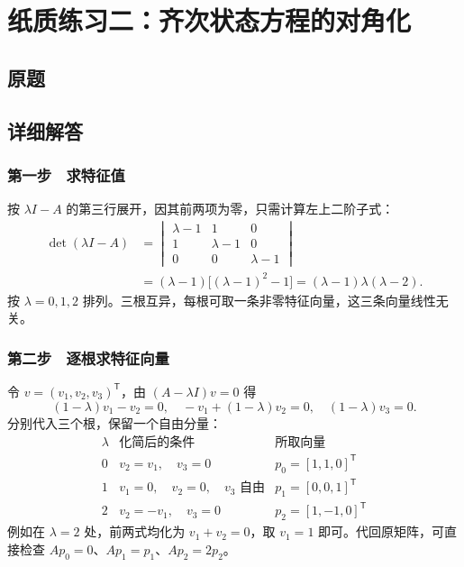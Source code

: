 \chapter{纸质练习二：齐次状态方程的对角化}

\section{原题}


\section{详细解答}

\subsection{第一步　求特征值}

按 $\lambda I-A$ 的第三行展开，因其前两项为零，只需计算左上二阶子式：
\[
\begin{aligned}
 \det(\lambda I-A)
 &=\begin{vmatrix}\lambda-1&1&0\\1&\lambda-1&0\\0&0&\lambda-1\end{vmatrix}\\
 &=(\lambda-1)\big[(\lambda-1)^2-1\big]
 =(\lambda-1)\lambda(\lambda-2).
\end{aligned}
\]
按 $\lambda=0,1,2$ 排列。三根互异，每根可取一条非零特征向量，这三条向量线性无关。

\subsection{第二步　逐根求特征向量}

令 $v=(v_1,v_2,v_3)^{\mathsf T}$，由 $(A-\lambda I)v=0$ 得
\[
 (1-\lambda)v_1-v_2=0,\quad
 -v_1+(1-\lambda)v_2=0,\quad
 (1-\lambda)v_3=0.
\]
分别代入三个根，保留一个自由分量：
\[
\begin{array}{c|l|c}
\lambda&\text{化简后的条件}&\text{所取向量}\\ \hline
0&v_2=v_1,\quad v_3=0 & p_0=[1,1,0]^{\mathsf T}\\[1pt]
1&v_1=0,\quad v_2=0,\quad v_3\text{ 自由} & p_1=[0,0,1]^{\mathsf T}\\[1pt]
2&v_2=-v_1,\quad v_3=0 & p_2=[1,-1,0]^{\mathsf T}
\end{array}
\]
例如在 $\lambda=2$ 处，前两式均化为 $v_1+v_2=0$，取 $v_1=1$ 即可。代回原矩阵，可直接检查 $Ap_0=0$、$Ap_1=p_1$、$Ap_2=2p_2$。

